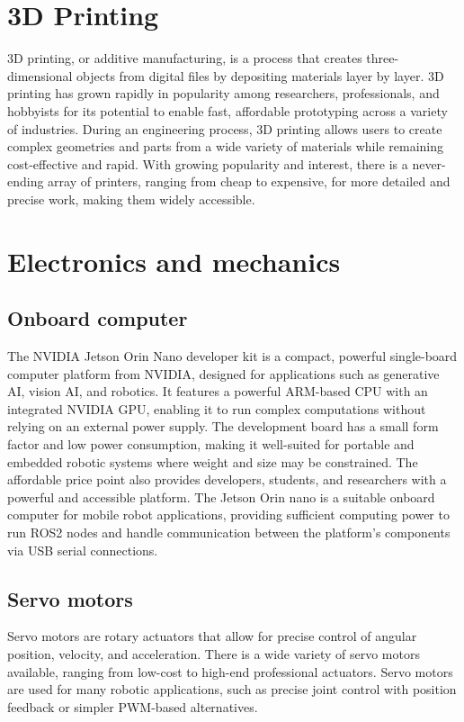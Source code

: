 \section*{3D Printing}
3D printing, or additive manufacturing, is a process that creates three-dimensional objects from digital files by depositing materials layer by layer. 3D printing has grown rapidly in popularity among researchers, professionals, and hobbyists for its potential to enable fast, affordable prototyping across a variety of industries.
During an engineering process, 3D printing allows users to create complex geometries and parts from a wide variety of materials while remaining cost-effective and rapid. With growing popularity and interest, there is a never-ending array of printers, ranging from cheap to expensive, for more detailed and precise work, making them widely accessible.

\section{Electronics and mechanics}

\subsection*{Onboard computer}
The NVIDIA Jetson Orin Nano developer kit is a compact, powerful single-board computer platform from NVIDIA, designed for applications such as generative AI, vision AI, and robotics. It features a powerful ARM-based CPU with an integrated NVIDIA GPU, enabling it to run complex computations without relying on an external power supply. The development board has a small form factor and low power consumption, making it well-suited for portable and embedded robotic systems where weight and size may be constrained. The affordable price point also provides developers, students, and researchers with a powerful and accessible platform. The Jetson Orin nano is a suitable onboard computer for mobile robot applications, providing sufficient computing power to run ROS2 nodes and handle communication between the platform's components via USB serial connections\cite{noauthor_jetson_nodate}.
\subsection*{Servo motors}
Servo motors are rotary actuators that allow for precise control of angular position, velocity, and acceleration. There is a wide variety of servo motors available, ranging from low-cost to high-end professional actuators. Servo motors are used for many robotic applications, such as precise joint control with position feedback or simpler PWM-based alternatives.
